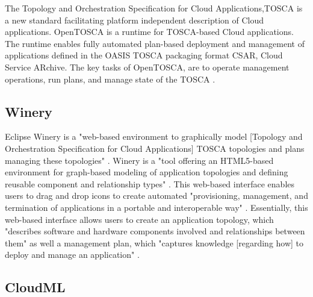 {     The Topology and Orchestration Specification for Cloud
     Applications,TOSCA is a new standard facilitating platform
     independent description of Cloud applications. OpenTOSCA is a
     runtime for TOSCA-based Cloud applications. The runtime enables
     fully automated plan-based deployment and management of
     applications defined in the OASIS TOSCA packaging format CSAR,
     Cloud Service ARchive.  The key tasks of OpenTOSCA, are to
     operate management operations, run plans, and manage state of the
     TOSCA \cite{openTOSCA-paper}.
     
\subsection{Winery \cv}

     Eclipse Winery is a "web-based environment to
     graphically model [Topology and Orchestration Specification for 
     Cloud Applications] TOSCA topologies and plans managing these 
     topologies" \cite{www-winery}. Winery is a "tool
     offering an HTML5-based environment for graph-based modeling of 
     application topologies and defining reusable component and 
     relationship types" \cite{winery-paper-2013}. This web-based
     interface enables users to drag and drop icons to create 
     automated "provisioning, management, and termination of 
     applications in a portable and interoperable way" \cite{winery-paper-2013}.
     Essentially, this web-based interface
     allows users to create an application topology, which 
     "describes software and hardware components involved and 
     relationships between them" as well a management plan, which 
     "captures knowledge [regarding how] to deploy and manage an 
     application" \cite{winery-paper-2013}.

     \pv
     

\subsection{CloudML}
                                                            
}
